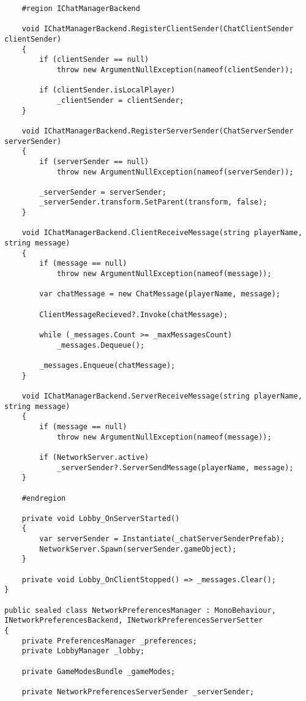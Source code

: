 \begin{lstlisting}
    #region IChatManagerBackend

    void IChatManagerBackend.RegisterClientSender(ChatClientSender clientSender)
    {
        if (clientSender == null)
            throw new ArgumentNullException(nameof(clientSender));

        if (clientSender.isLocalPlayer)
            _clientSender = clientSender;
    }

    void IChatManagerBackend.RegisterServerSender(ChatServerSender serverSender)
    {
        if (serverSender == null)
            throw new ArgumentNullException(nameof(serverSender));

        _serverSender = serverSender;
        _serverSender.transform.SetParent(transform, false);
    }

    void IChatManagerBackend.ClientReceiveMessage(string playerName, string message)
    {
        if (message == null)
            throw new ArgumentNullException(nameof(message));

        var chatMessage = new ChatMessage(playerName, message);

        ClientMessageRecieved?.Invoke(chatMessage);

        while (_messages.Count >= _maxMessagesCount)
            _messages.Dequeue();

        _messages.Enqueue(chatMessage);
    }

    void IChatManagerBackend.ServerReceiveMessage(string playerName, string message)
    {
        if (message == null)
            throw new ArgumentNullException(nameof(message));

        if (NetworkServer.active)
            _serverSender?.ServerSendMessage(playerName, message);
    }

    #endregion

    private void Lobby_OnServerStarted()
    {
        var serverSender = Instantiate(_chatServerSenderPrefab);
        NetworkServer.Spawn(serverSender.gameObject);
    }

    private void Lobby_OnClientStopped() => _messages.Clear();
}

public sealed class NetworkPreferencesManager : MonoBehaviour, INetworkPreferencesBackend, INetworkPreferencesServerSetter
{
    private PreferencesManager _preferences;
    private LobbyManager _lobby;

    private GameModesBundle _gameModes;

    private NetworkPreferencesServerSender _serverSender;


\end{lstlisting}
